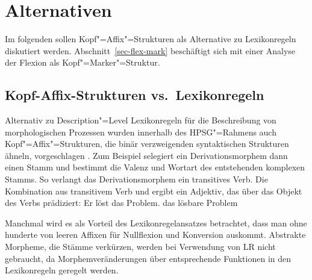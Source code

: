 

\section{Alternativen}

Im folgenden sollen Kopf"=Affix"=Strukturen als Alternative zu Lexikonregeln diskutiert werden.
Abschnitt~\ref{sec-flex-mark} beschäftigt sich mit einer Analyse der Flexion als Kopf"=Marker"=Struktur.

\subsection{Kopf-Affix-Strukturen vs.\ Lexikonregeln}
\label{morphem-vs-lr}

Alternativ zu Description"=Level Lexikonregeln für die Beschreibung von morphologischen Prozessen
\parencites{Orgun96a}{Riehemann98a}{AW98a}{Koenig99a}[Kapitel~6.2.5]{Mueller2002b}{Crysmann2002a} wurden innerhalb des HPSG"=Rahmens
auch Kopf"=Affix"=Strukturen, die binär verzweigenden syntaktischen Strukturen ähneln, vorgeschlagen 
\parencites{KN93a}{Krieger94a}{Eynde94}{Lebeth94}.
Zum Beispiel selegiert ein Derivationsmorphem dann einen Stamm und bestimmt die Valenz und Wortart
des entstehenden komplexen Stamms. So verlangt das Derivationsmorphem  ein transitives
Verb. Die Kombination aus transitivem Verb und  ergibt ein Adjektiv, das über
das Objekt des Verbs prädiziert:
\eal
\ex Er löst das Problem.
\ex das lösbare Problem
\zl


\noindent
Manchmal wird es als Vorteil des Lexikonregelansatzes betrachtet, dass man ohne hunderte von leeren
Affixen für Nullflexion und Konversion auskommt. Abstrakte Morpheme, die Stämme verkürzen, werden bei Verwendung
von LR nicht gebraucht, da Morphemveränderungen über entsprechende Funktionen in den Lexikonregeln
geregelt werden. 

